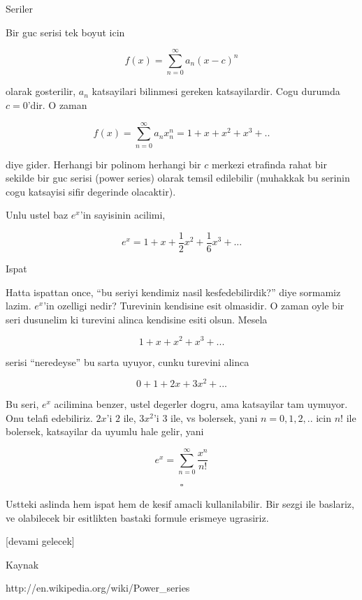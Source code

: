 \documentclass[12pt,fleqn]{article}\usepackage{../common}
\begin{document}
Seriler

Bir guc serisi tek boyut icin 

\[ f(x) = \sum _{ n=0}^{\infty} a_n (x-c)^n\]

olarak gosterilir, $a_n$ katsayilari bilinmesi gereken katsayilardir. Cogu
durumda $c=0$'dir. O zaman 

\[ f(x) = \sum _{ n=0}^{\infty} a_n x_n^n = 1+x+x^2+x^3+..\]

diye gider. Herhangi bir polinom herhangi bir $c$ merkezi etrafinda rahat
bir sekilde bir guc serisi (power series) olarak temsil edilebilir
(muhakkak bu serinin cogu katsayisi sifir degerinde olacaktir). 

Unlu ustel baz $e^x$'in sayisinin acilimi, 

\[ e^x = 1 + x + \frac{1}{2}x^2 + \frac{1}{6}x^3 + ... \]

Ispat

Hatta ispattan once, ``bu seriyi kendimiz nasil kesfedebilirdik?'' diye
sormamiz lazim. $e^x$'in ozelligi nedir? Turevinin kendisine esit
olmasidir. O zaman oyle bir seri dusunelim ki turevini alinca kendisine
esiti olsun. Mesela

\[ 1 + x + x^2 + x^3 + ... \]

serisi ``neredeyse'' bu sarta uyuyor, cunku turevini alinca 

\[ 0 + 1 + 2x + 3x^2 + ... \]

Bu seri, $e^x$ acilimina benzer, ustel degerler dogru, ama katsayilar
tam uymuyor. Onu telafi edebiliriz. $2x$'i $2$ ile, $3x^2$'i $3$ ile, vs
bolersek, yani $n=0,1,2,..$ icin $n!$ ile bolersek, katsayilar da uyumlu
hale gelir, yani 

\[ e^x = \sum _{ n=0}^{\infty} \frac{ x^n}{n!} \]

\[ \square \]

Ustteki aslinda hem ispat hem de kesif amacli kullanilabilir. Bir sezgi ile
baslariz, ve olabilecek bir esitlikten bastaki formule erismeye ugrasiriz. 

[devami gelecek]

Kaynak

http://en.wikipedia.org/wiki/Power\_series
\end{document}
